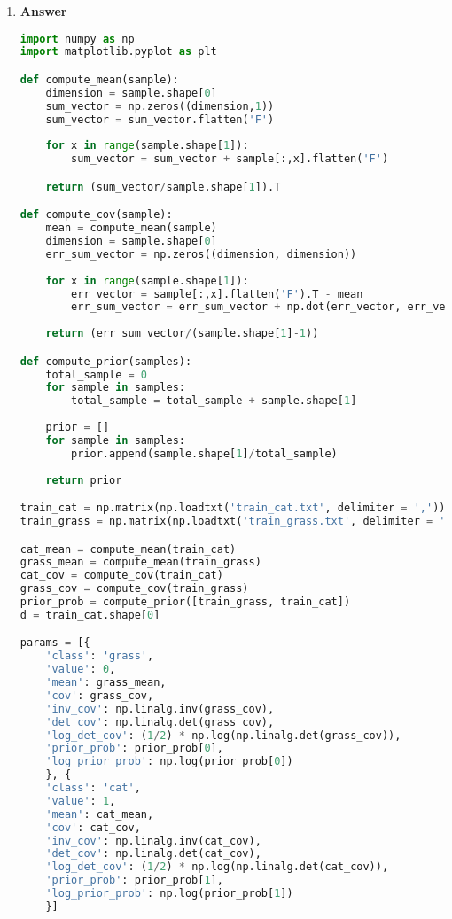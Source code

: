 \documentclass[11pt]{article}
\begin{document}
\begin{enumerate}[label=(\alph*)]


\item  \textbf{Answer}

\begin{lstlisting}[language=Python, showstringspaces=false]
import numpy as np
import matplotlib.pyplot as plt

def compute_mean(sample):
    dimension = sample.shape[0]
    sum_vector = np.zeros((dimension,1))
    sum_vector = sum_vector.flatten('F') 
    
    for x in range(sample.shape[1]):
        sum_vector = sum_vector + sample[:,x].flatten('F')

    return (sum_vector/sample.shape[1]).T

def compute_cov(sample):
    mean = compute_mean(sample)
    dimension = sample.shape[0]
    err_sum_vector = np.zeros((dimension, dimension))
    
    for x in range(sample.shape[1]):
        err_vector = sample[:,x].flatten('F').T - mean
        err_sum_vector = err_sum_vector + np.dot(err_vector, err_vector.T)
        
    return (err_sum_vector/(sample.shape[1]-1))

def compute_prior(samples):
    total_sample = 0
    for sample in samples:
        total_sample = total_sample + sample.shape[1]
        
    prior = []
    for sample in samples:
        prior.append(sample.shape[1]/total_sample)
        
    return prior

train_cat = np.matrix(np.loadtxt('train_cat.txt', delimiter = ','))
train_grass = np.matrix(np.loadtxt('train_grass.txt', delimiter = ','))

cat_mean = compute_mean(train_cat)
grass_mean = compute_mean(train_grass)
cat_cov = compute_cov(train_cat)
grass_cov = compute_cov(train_grass)
prior_prob = compute_prior([train_grass, train_cat])
d = train_cat.shape[0]

params = [{
    'class': 'grass',
    'value': 0,
    'mean': grass_mean,
    'cov': grass_cov,
    'inv_cov': np.linalg.inv(grass_cov),
    'det_cov': np.linalg.det(grass_cov),
    'log_det_cov': (1/2) * np.log(np.linalg.det(grass_cov)),
    'prior_prob': prior_prob[0],
    'log_prior_prob': np.log(prior_prob[0])
    }, {
    'class': 'cat',
    'value': 1,
    'mean': cat_mean,
    'cov': cat_cov,
    'inv_cov': np.linalg.inv(cat_cov),
    'det_cov': np.linalg.det(cat_cov),
    'log_det_cov': (1/2) * np.log(np.linalg.det(cat_cov)),
    'prior_prob': prior_prob[1],
    'log_prior_prob': np.log(prior_prob[1])
    }]
\end{lstlisting}


\end{enumerate}
\end{document}

